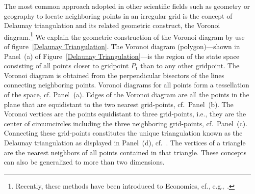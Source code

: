 \documentclass[a4paper,12pt]{article}
\begin{document}
The most common approach adopted in other scientific fields such as geometry or geography to locate neighboring points in an irregular grid is the concept of Delaunay triangulation and its related geometric construct, the Voronoi diagram.\footnote{Recently, these methods have been introduced to Economics, cf., e.g., .}
We explain the geometric construction of the Voronoi diagram by use of figure~\ref{Delaunay Triangulation}. The Voronoi diagram (polygon)---shown in Panel~(a) of Figure~\ref{Delaunay Triangulation}---is the region of the state space consisting of all points closer to gridpoint $P_{1}$ than to any other gridpoint. The Voronoi diagram is obtained from the perpendicular bisectors of the lines connecting neighboring points. Voronoi diagrams for all points form a tessellation of the space, cf. Panel~(a). Edges of the Voronoi diagram are all the points in the plane that are equidistant to the two nearest grid-points, cf.~Panel~(b). The Voronoi vertices are the points equidistant to three grid-points, i.e., they are the center of circumcircles including the three neighboring grid-points, cf.~Panel~(c). Connecting these grid-points constitutes the unique triangulation known as the Delaunay triangulation as displayed in Panel~(d), cf.~. The vertices of a triangle are the nearest neighbors of all points contained in that triangle. These concepts can also be generalized to more than two dimensions.
\end{document}
